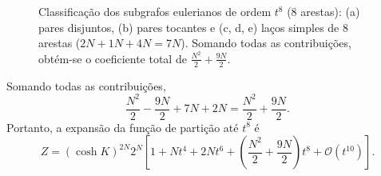 \documentclass[11pt,a4paper]{article}
\begin{document}
\begin{figure}[htbp]
    \caption{Classificação dos subgrafos eulerianos de ordem $t^8$ ($8$ arestas): (a) pares disjuntos, (b) pares tocantes e (c, d, e) laços simples de 8 arestas ($2N + 1N + 4N = 7N$). Somando todas as contribuições, obtém-se o coeficiente total de $\frac{N^2}{2} + \frac{9N}{2}$.}
    \label{fig:ordem_t8_completo}
\end{figure}
%
Somando todas as contribuições,
%
\begin{equation}
    \frac{N^2}{2} - \frac{9N}{2} + 7N + 2N
    = \frac{N^2}{2} + \frac{9N}{2}.
\end{equation}
%
Portanto, a expansão da função de partição até $t^8$ é
%
\begin{equation}
    \boxed{
    Z = (\cosh K)^{2N} 2^N
    \left[
    1 + N t^4 + 2N t^6
    + \left(\frac{N^2}{2} + \frac{9N}{2}\right) t^8
    + \mathcal O(t^{10})
    \right].
    }
    \label{eq:Z_expansion}
\end{equation}
\end{document}
